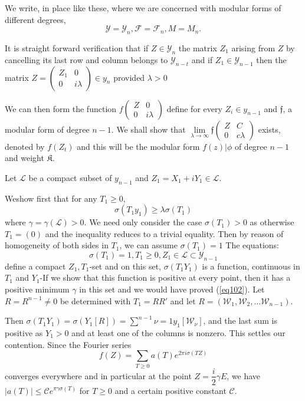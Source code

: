 We write, in place like these, where we are concerned with modular
forms of different degrees, 
$$
\mathscr{Y}=\mathscr{Y}_n, \mathcal{F}=\mathcal{F}_n, M=M_n.
$$

It is straight forward verification that if $Z \in \mathscr{Y}_n$ the
matrix $Z_1$ arising from $Z$ by cancelling its last row and column
belongs to  $\mathscr{Y}_{n-t}$ and if $Z_1 \in \mathscr{Y}_{n-1}$ then
the matrix $Z= \begin{pmatrix}Z_1&0 \\ 0& i \lambda \end{pmatrix}
\in y_n$ provided $\lambda >0$ 

We can then form the function $f \begin{pmatrix} Z &0 \\0&i
  \lambda \end{pmatrix}$ define for every $Z_i  \in y_{n-1}$ and
$\mathfrak{f}$, a modular form of degree $n-1$. We shall show
that $\lim \limits _{\lambda \to \infty}\mathfrak{f} \begin{pmatrix} Z
  &C \\0&c \lambda \end{pmatrix}$ exists, denoted by $f(Z_t)$ and this
will be the modular form $f(z)| \phi$ of degree $n-1$ and weight
$\mathfrak{K}$. 

Let $\mathcal{L}$ be a compact subset of $y_{n-1}$ and $Z_1= X_1
 + i Y_1 \in \mathcal{L}$. 

We\pageoriginale show first that for any $T_1 \ge 0$,
\begin{equation*}
\sigma (T_1y_1) \ge \lambda \sigma (T_1) \tag{102}\label{eq102}
\end{equation*}
where $\gamma =\gamma (\mathcal{L})>0$. We need only consider the case
$\sigma (T_1)>0$ as otherwise $T_1=(0)$ and the inequality reduces to
a trivial equality. Then by reason of homogeneity of both sides in
$T_1$, we can assume $\sigma (T_1)=1$ The equations: 
$$
\sigma (T_1)=1, T_1 \ge 0,Z_1 \in \mathcal{L}\subset \mathscr{Y}_{n-1}
$$
define a compact $Z_1,T_1$-set and on this set, $\sigma (T_1Y_1)$ is a
function, continuous in $T_1$ and $Y_1$-If we show that this function
is positive at every point, then it has a positive minimum $\gamma$ in
this set and we would have proved (\ref{eq102}). Let $R=R^{n-1} \neq 0$ be
determined with $T_1=RR'$ and let
$R=(\mathscr{W}_1,\mathscr{W}_2,\ldots \mathscr{W}_{n-1})$. 

Then $\sigma (T_1Y_1)=\sigma(Y_1 [R])=\sum^{n-1}{\nu=1}
y_1[\mathscr{W}_\nu]$, and the last sum is positive as $Y_1>0$ and at
least one of the columns is nonzero. This settles our
contention. Since the Fourier series  
$$
f(Z)=\sum_{T\ge 0} a (T)e^{2 \pi i \sigma (TZ)}
$$
converges everywhere and in particular at the point
$Z=\dfrac{i}{2}\gamma E$, we have $|a(T)|\le \mathscr{C}e^{\pi
  \gamma \sigma (T)}$ for $T \ge 0$ and a certain positive constant
$\mathscr{C}$. 

